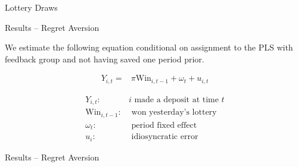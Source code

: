 \documentclass[aspectratio=169]{beamer}
\begin{document}
\begin{frame}{Lottery Draws}

	

\end{frame}

\begin{frame}{Results -- Regret Aversion}

	We estimate the following equation conditional on assignment to the PLS with feedback group and not having saved one period prior.

	\begin{equation} \begin{split}
		Y_{i,t} = & \pi \text{Win}_{i,t-1} + \omega_{t} + u_{i,t}
	\end{split} \label{eq:regret} \end{equation}

	\begin{align*}
	Y_{i,t}: & i \text{~made a deposit at time~} t \\
	\text{Win}_{i,t-1}: & \text{~won yesterday's lottery} \\
	\omega_t: & \text{~period fixed effect} \\
	u_i: & \text{~idiosyncratic error}
	\end{align*}

\end{frame}

\begin{frame}{Results -- Regret Aversion}
	
	


\end{frame}
\end{document}
